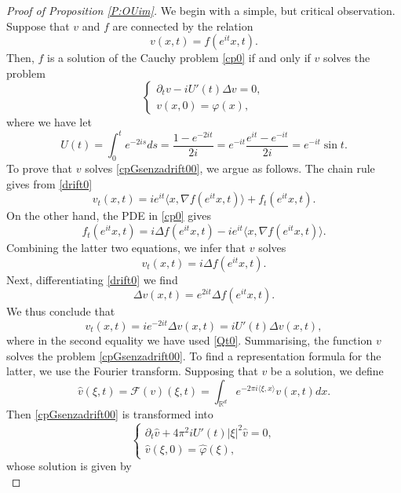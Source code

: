 \documentclass[11pt,a4paper]{amsart}
\def \vf{\varphi}
\newcommand{\Rm}{\mathbb R^d}
\newcommand{\p}{\partial}
\numberwithin{equation}{section}
\newcommand{\sa}{\langle}
\newcommand{\da}{\rangle}
\numberwithin{equation}{section}
\begin{document}
\begin{proof}[Proof of Proposition \ref{P:OUim}]

We begin with a simple, but critical observation. Suppose that $v$ and $f$ are connected by the relation
\begin{equation}\label{drift0}
v(x,t) = f(e^{i t} x,t).
\end{equation}
Then, $f$ is a solution of the Cauchy problem \eqref{cp0} if and only if $v$ solves the problem
\begin{equation}\label{cpGsenzadrift00}
\begin{cases}
\p_t v - i U'(t) \Delta v = 0,
\\
v(x,0) = \vf(x),
\end{cases}
\end{equation} 
where we have let
\begin{equation}\label{Qt0}
U(t) =  \int_0^t e^{-2is} ds = \frac{1-e^{-2it}}{2i} = e^{-it} \frac{e^{it}-e^{-it}}{2i} = e^{-it} \sin t.
\end{equation}
To prove that $v$ solves \eqref{cpGsenzadrift00}, we argue as follows. The chain rule gives from \eqref{drift0}
\[
v_t(x,t) = i e^{it} \sa x,\nabla f(e^{it} x,t)\da + f_t(e^{it} x,t).
\]
On the other hand, the PDE in \eqref{cp0} gives
\[
f_t(e^{it} x,t) = i \Delta f(e^{it} x,t) - i e^{it} \sa x,\nabla f(e^{it} x,t)\da.
\]
Combining the latter two equations, we infer that $v$ solves 
\[
v_t(x,t) = i \Delta f(e^{it} x,t).
\]
Next, differentiating \eqref{drift0} we find
\[
\Delta v(x,t) = e^{2it} \Delta f(e^{it} x,t).
\]
We thus conclude that 
\[
v_t(x,t) = i e^{-2it} \Delta v(x,t) = i U'(t) \Delta v(x,t),
\]
where in the second equality we have used \eqref{Qt0}.
Summarising, the function $v$ solves the problem \eqref{cpGsenzadrift00}.
To find a representation formula for the latter, we use the Fourier transform.
Supposing that $v$ be a solution, we define
\begin{equation}\label{pFTv}
\hat v(\xi,t) = \mathscr F(v)(\xi,t) = \int_{\Rm} e^{-2\pi i\sa \xi,x\da} v(x,t) dx.
\end{equation}
Then \eqref{cpGsenzadrift00} is transformed into
\begin{equation}\label{cpGsenzadrift0}
\begin{cases}
\p_t \hat v + 4\pi^2 i U'(t)|\xi|^2 \hat v = 0,
\\
\hat v(\xi,0) = \hat \vf(\xi),
\end{cases}
\end{equation} 
whose solution is given by
\begin{equation}\label{hatv}

\end{equation}
\end{proof}
\end{document}
